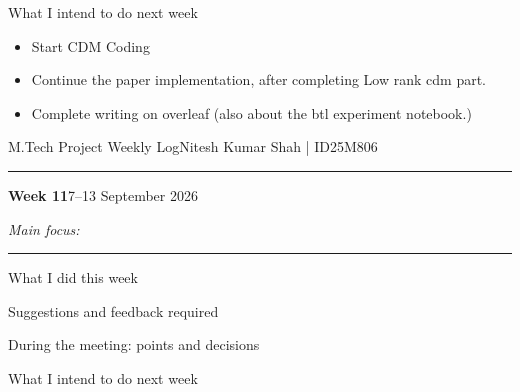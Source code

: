 \documentclass[10pt]{article}
\newcommand{\weekheading}[3]{%
  {\small M.Tech Project Weekly Log}\hfill{\small Nitesh Kumar Shah \;|\; ID25M806}\par
  \vspace{2pt}\hrule\vspace{7pt}
  {\Large\bfseries Week #1}\hfill{\normalsize #2}\par
  \vspace{2pt}
  {\itshape #3}\par
  \vspace{5pt}\hrule\vspace{7pt}
}
\newcommand{\blankentry}{\begin{center}\textemdash\end{center}}
\begin{document}
\begin{weeklybox}{What I intend to do next week}
  \small
  \begin{itemize}
    \item Start CDM Coding 
    \item Continue the paper implementation, after completing Low rank cdm part.
    \item Complete writing on overleaf (also about the btl experiment notebook.)
  \end{itemize}
\end{weeklybox}


\newpage
\weekheading{11}{7--13 September 2026}{Main focus: \textemdash}

\begin{weeklybox}{What I did this week}
  \blankentry
\end{weeklybox}

\begin{weeklybox}{Suggestions and feedback required}
  \blankentry
\end{weeklybox}

\begin{weeklybox}{During the meeting: points and decisions}
  \blankentry
\end{weeklybox}

\begin{weeklybox}{What I intend to do next week}
  \blankentry
\end{weeklybox}

\vfill
\end{document}
